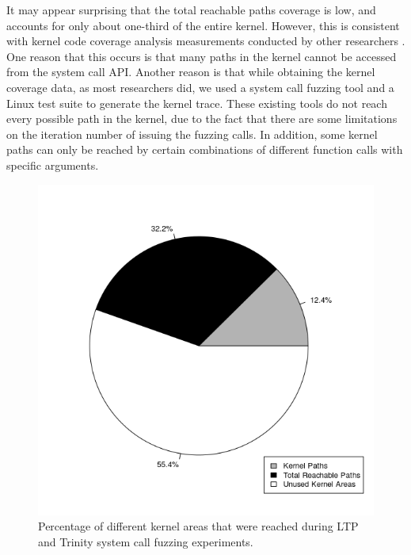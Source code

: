 It may appear surprising that the total reachable paths coverage is low,
and accounts for only about one-third of the entire kernel. However,
this is consistent with kernel code coverage analysis
measurements conducted by other researchers \cite{LTP-Coverage}.
One reason that this occurs is that many paths
in the kernel cannot be accessed from the system call API. Another reason
is that
while obtaining the kernel coverage data, as most researchers did, we used
a system call fuzzing tool
and a Linux test suite to generate the kernel trace. These existing
tools do not reach every possible path in the kernel, due to
the fact that there are some limitations on the iteration number of issuing
the fuzzing calls. In addition, some kernel paths can only be reached by
certain combinations of different function calls with specific arguments.


\begin{figure}%
\centering
\includegraphics[width=1.0\columnwidth]{diagram/kernelcoverage.png}
\caption{Percentage of different kernel areas that were reached during
 LTP and Trinity system call fuzzing experiments.}
\label{fig:coverage}
\end{figure}



